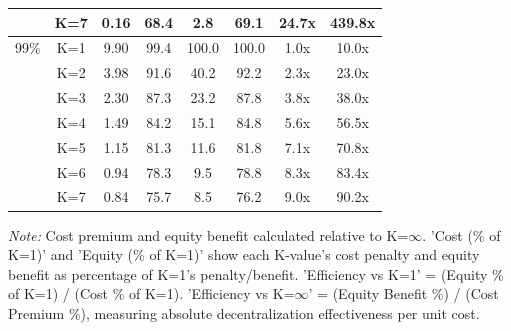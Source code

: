 \documentclass[preprint,12pt,nopreprintline]{elsarticle}
\begin{document}
\begin{table}[htbp]
{\begin{tabular}{cccccccc}
 & K=7 & 0.16 & 68.4 & 2.8 & 69.1 & 24.7x & 439.8x \\
\midrule
99\% & K=1 & 9.90 & 99.4 & 100.0 & 100.0 & 1.0x & 10.0x \\
 & K=2 & 3.98 & 91.6 & 40.2 & 92.2 & 2.3x & 23.0x \\
 & K=3 & 2.30 & 87.3 & 23.2 & 87.8 & 3.8x & 38.0x \\
 & K=4 & 1.49 & 84.2 & 15.1 & 84.8 & 5.6x & 56.5x \\
 & K=5 & 1.15 & 81.3 & 11.6 & 81.8 & 7.1x & 70.8x \\
 & K=6 & 0.94 & 78.3 & 9.5 & 78.8 & 8.3x & 83.4x \\
 & K=7 & 0.84 & 75.7 & 8.5 & 76.2 & 9.0x & 90.2x \\
\bottomrule
\end{tabular}}
\begin{tablenotes}
\small
\item \textit{Note:} Cost premium and equity benefit calculated relative to K=$\infty$. 
'Cost (\% of K=1)' and 'Equity (\% of K=1)' show each K-value's cost penalty and equity benefit as percentage of K=1's penalty/benefit. 
'Efficiency vs K=1' = (Equity \% of K=1) / (Cost \% of K=1). 
'Efficiency vs K=$\infty$' = (Equity Benefit \%) / (Cost Premium \%), measuring absolute decentralization effectiveness per unit cost.
\end{tablenotes}
\end{table}
\end{document}

